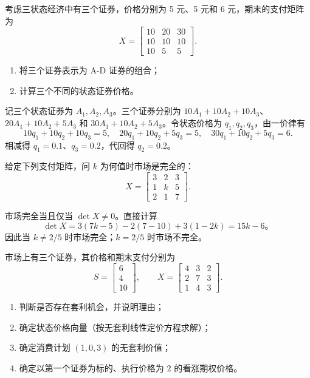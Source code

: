 \begin{problem}
 考虑三状态经济中有三个证券，价格分别为 \num{5} 元、\num{5} 元和 \num{6} 元，期末的支付矩阵为
\[
    X=\begin{bmatrix}
        10 & 20 & 30\\
        10 & 10 & 10\\
        10 & 5 & 5
    \end{bmatrix}.
\]
\begin{enumerate}[label=(\alph*)]
    \item 将三个证券表示为 A-D 证券的组合；
    \item 计算三个不同的状态证券价格。
\end{enumerate}
\end{problem}
\begin{solution}
记三个状态证券为 $A_1,A_2,A_3$。三个证券分别为 $10A_1+10A_2+10A_3$、$20A_1+10A_2+5A_3$ 和 $30A_1+10A_2+5A_3$。令状态价格为 $q_1,q_2,q_3$，由一价律有
\[
10q_1+10q_2+10q_3=5,\quad20q_1+10q_2+5q_3=5,\quad30q_1+10q_2+5q_3=6.
\]
相减得 $q_1=0.1$、$q_3=0.2$，代回得 $q_2=0.2$。
\end{solution}
\begin{problem}
 给定下列支付矩阵，问 $k$ 为何值时市场是完全的：
\[
    X=\begin{bmatrix}
        3 & 2 & 3\\
        1 & k & 5\\
        2 & 1 & 7
    \end{bmatrix}.
\]
\end{problem}
\begin{solution}
市场完全当且仅当 $\det X\ne0$。直接计算
\[
\det X=3(7k-5)-2(7-10)+3(1-2k)=15k-6。
\]
因此当 $k\ne2/5$ 时市场完全；$k=2/5$ 时市场不完全。
\end{solution}
\begin{problem}
 市场上有三个证券，其价格和期末支付分别为
\[
    S=\begin{bmatrix}6\\4\\10\end{bmatrix},\qquad
    X=\begin{bmatrix}
        4 & 3 & 2\\
        2 & 7 & 3\\
        1 & 4 & 3
    \end{bmatrix}.
\]
\begin{enumerate}[label=(\alph*)]
    \item 判断是否存在套利机会，并说明理由；
    \item 确定状态价格向量（按无套利线性定价方程求解）；
    \item 确定消费计划 $(1,0,3)$ 的无套利价值；
    \item 确定以第一个证券为标的、执行价格为 $2$ 的看涨期权价格。
\end{enumerate}
\end{problem}
